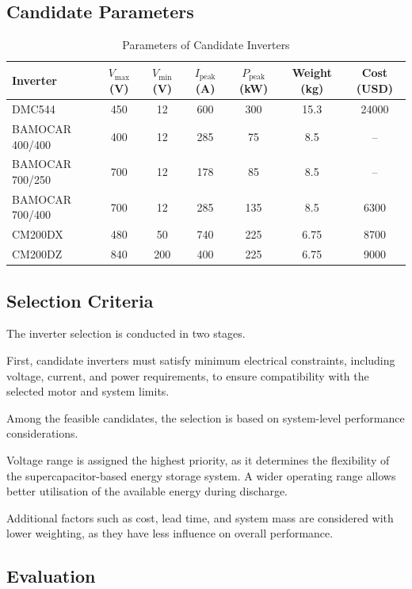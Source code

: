 \subsection{Candidate Parameters}

\begin{table}[H]
\centering
\caption{Parameters of Candidate Inverters}
\label{tab:inverter_parameters}
\begin{tabular}{lcccccc}
\toprule
Inverter & $V_{\text{max}}$ (V) & $V_{\text{min}}$ (V) & $I_{\text{peak}}$ (A) & $P_{\text{peak}}$ (kW) & Weight (kg) & Cost (USD) \\
\midrule
DMC544 & 450 & 12 & 600 & 300 & 15.3 & 24000 \\
BAMOCAR 400/400 & 400 & 12 & 285 & 75 & 8.5 & -- \\
BAMOCAR 700/250 & 700 & 12 & 178 & 85 & 8.5 & -- \\
BAMOCAR 700/400 & 700 & 12 & 285 & 135 & 8.5 & 6300 \\
CM200DX & 480 & 50 & 740 & 225 & 6.75 & 8700 \\
CM200DZ & 840 & 200 & 400 & 225 & 6.75 & 9000 \\
\bottomrule
\end{tabular}
\end{table}

\subsection{Selection Criteria}

The inverter selection is conducted in two stages.

First, candidate inverters must satisfy minimum electrical constraints, including voltage, current, and power requirements, to ensure compatibility with the selected motor and system limits.

Among the feasible candidates, the selection is based on system-level performance considerations.

Voltage range is assigned the highest priority, as it determines the flexibility of the supercapacitor-based energy storage system. A wider operating range allows better utilisation of the available energy during discharge.

Additional factors such as cost, lead time, and system mass are considered with lower weighting, as they have less influence on overall performance.

\subsection{Evaluation}

